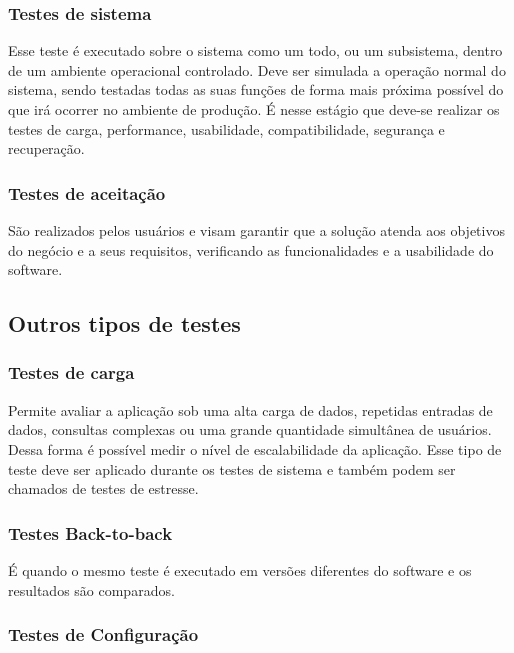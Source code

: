 \subsubsection{Testes de sistema}

Esse teste é executado sobre o sistema como um todo, ou um subsistema, dentro de um ambiente operacional controlado. Deve ser simulada a operação normal do sistema, sendo testadas todas as suas funções de forma mais próxima possível do que irá ocorrer no ambiente de produção. É nesse estágio que deve-se realizar os testes de carga, performance, usabilidade, compatibilidade, segurança e recuperação.

\subsubsection{Testes de aceitação}

São realizados pelos usuários e visam garantir que a solução atenda aos objetivos do negócio e a seus requisitos, verificando as funcionalidades e a usabilidade do software.

\subsection{Outros tipos de testes}


\subsubsection{Testes de carga}

Permite avaliar a aplicação sob uma alta carga de dados, repetidas entradas de dados, consultas complexas ou uma grande quantidade simultânea de usuários. Dessa forma é possível medir o nível de escalabilidade da aplicação. Esse tipo de teste deve ser aplicado durante os testes de sistema e também podem ser chamados de testes de estresse.

\subsubsection{Testes Back-to-back}

É quando o mesmo teste é executado em versões diferentes do software e os resultados são comparados.

\subsubsection{Testes de Configuração}

